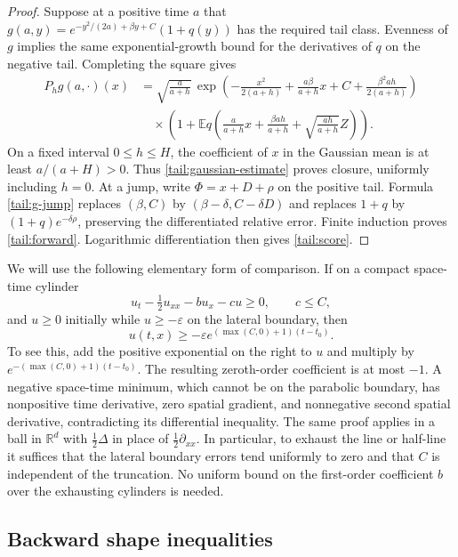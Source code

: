 \begin{proof}
Suppose at a positive time $a$ that
$g(a,y)=e^{-y^2/(2a)+\beta y+C}(1+q(y))$ has the required tail class.
Evenness of $g$ implies the same exponential-growth bound for the
derivatives of $q$ on the negative tail.  Completing the square gives
\begin{align*}
 P_hg(a,\cdot)(x)
 &=\sqrt{\frac a{a+h}}\,
   \exp\left(-\frac{x^2}{2(a+h)}
      +\frac{a\beta}{a+h}x+C+\frac{\beta^2ah}{2(a+h)}\right)\\
 &\quad\times
   \left(1+\mathbb E q\left(
        \frac a{a+h}x+\frac{\beta ah}{a+h}
           +\sqrt{\frac{ah}{a+h}}Z\right)\right).
\end{align*}
On a fixed interval $0\le h\le H$, the coefficient of $x$ in the
Gaussian mean is at least $a/(a+H)>0$.  Thus
\eqref{tail:gaussian-estimate} proves closure, uniformly including $h=0$.
At a jump, write $\Phi=x+D+\rho$ on the positive tail.  Formula
\eqref{tail:g-jump} replaces $(\beta,C)$ by
$(\beta-\delta,C-\delta D)$ and replaces $1+q$ by
$(1+q)e^{-\delta\rho}$, preserving the differentiated relative error.
Finite induction proves \eqref{tail:forward}.  Logarithmic differentiation
then gives \eqref{tail:score}.
\end{proof}



We will use the following elementary form of comparison.  If on a compact
space-time cylinder
\[
 u_t-\tfrac12u_{xx}-b u_x-c u\ge0,\qquad c\le C,
\]
and $u\ge0$ initially while $u\ge-\varepsilon$ on the lateral boundary,
then
\begin{equation}\label{shape:barrier}
 u(t,x)\ge-\varepsilon e^{(\max(C,0)+1)(t-t_0)}.
\end{equation}
To see this, add the positive exponential on the right to $u$ and multiply
by $e^{-(\max(C,0)+1)(t-t_0)}$.  The resulting zeroth-order coefficient
is at most $-1$.  A negative space-time minimum, which cannot be on the
parabolic boundary, has nonpositive time derivative, zero spatial gradient,
and nonnegative second spatial derivative, contradicting its differential
inequality.  The same proof applies in a ball in $\mathbb R^d$ with
$\tfrac12\Delta$ in place of $\tfrac12\partial_{xx}$.
In particular, to exhaust the line or half-line it suffices that the
lateral boundary errors tend uniformly to zero and that $C$ is independent
of the truncation.  No uniform bound on the first-order coefficient $b$
over the exhausting cylinders is needed.

\subsection{Backward shape inequalities}

